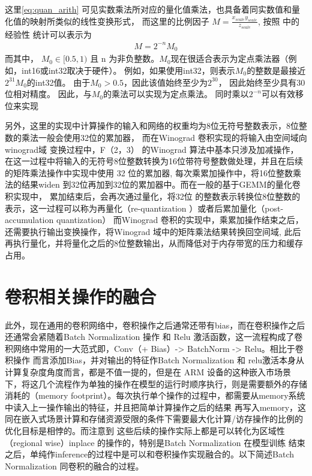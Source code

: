 这里\ref{eq:quan_arith} 可见实数乘法所对应的量化值乘法，也具备着同实数值和量化值的映射所类似的线性变换形式，
而这里的比例因子 $ M = \frac{x_{scale} y_{scale}}{z_{scale}}$, 按照 \cite{Jacob2017QuantizationAT} 中的经验性
统计可以表示为
\begin{align}
M = 2^{-n} M_0
\end{align}
而其中， $M_0 \in [0.5, 1)$ 且 n 为非负整数。$ M_0$现在很适合表示为定点乘法器（例如，int16或int32取决于硬件）。
例如，如果使用int32，则表示$M_0$的整数是最接近$2^{31}M_0$的int32值。 由于$M_0> 0.5$，因此该值始终至少为$2^{30}$，
因此始终至少具有30位相对精度。 因此，与$M_0$的乘法可以实现为定点乘法。 同时乘以$2^{-n}$可以有效移位来实现

另外，这里的实现中计算操作的输入和网络的权重均为8位无符号整数表示，8位整数的乘法一般会使用32位的累加器，
而在Winograd 卷积实现的将输入由空间域向winograd域 变换过程中，F（2，3） 的Winograd 算法中基本只涉及加减操作，
在这一过程中将输入的无符号8位整数转换为16位带符号整数做处理，并且在后续的矩阵乘法操作中实现中使用 32 位的累加器,
每次乘累加操作中，将16位整数乘法的结果widen 到32位再加到32位的累加器中。而在一般的基于GEMM的量化卷积实现中，
累加结束后，会再次通过量化，将32位 的整数表示转换位8位整数的表示，这一过程可以称为再量化（re-quantization ）或者后累加量化（post-accumulation quantization）
而Winograd 卷积的实现中，乘累加操作结束之后，还需要执行输出变换操作，将Winograd 域中的矩阵乘法结果转换回空间域,
此后再执行量化，并将量化之后的8位整数输出，从而降低对于内存带宽的压力和缓存占用。

\section{卷积相关操作的融合}

此外，现在通用的卷积网络中，卷积操作之后通常还带有bias，而在卷积操作之后还通常会紧随着Batch Normalization 操作
和 Relu 激活函数，这一流程构成了卷积网络中常用的一大范式即，Conv（+ Bias）-> BatchNorm -> Relu。相比于卷积操作
而言添加Bias，并对输出的特征作Batch Normalization 和 relu激活本身从计算复杂度角度而言，都是不值一提的，但是在
ARM 设备的这种嵌入市场景下，将这几个流程作为单独的操作在模型的运行时顺序执行，则是需要额外的存储消耗的（memory 
footprint）。每次执行单个操作的过程中，都需要从memory系统中读入上一操作输出的特征，并且把简单计算操作之后的结果
再写入memory，这同在嵌入式场景计算和存储资源受限的条件下需要最大化计算/访存操作的比例的优化目标是相悖的。而注意到
这些后续的操作实际上都是可以转化为区域性（regional wise）inplace 的操作的，特别是Batch Normalization 在模型训练
结束之后，单纯作inference的过程中是可以和卷积操作实现融合的。以下简述Batch Normalization 同卷积的融合的过程。

